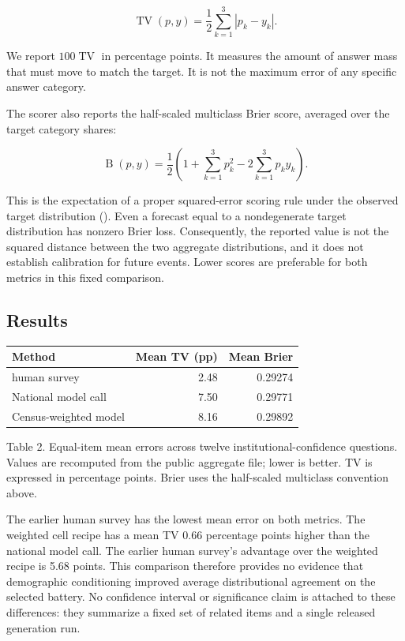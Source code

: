 \documentclass[
  11pt,
]{article}
\begin{document}
\[
\operatorname{TV}(p,y)=\frac{1}{2}\sum_{k=1}^{3}|p_k-y_k|.
\]

We report \(100\operatorname{TV}\) in percentage points. It measures the
amount of answer mass that must move to match the target. It is not the
maximum error of any specific answer category.

The scorer also reports the half-scaled multiclass Brier score, averaged
over the target category shares:

\[
\operatorname{B}(p,y)=\frac{1}{2}\left(1+\sum_{k=1}^{3}p_k^2-2\sum_{k=1}^{3}p_k y_k\right).
\]

This is the expectation of a proper squared-error scoring rule under the
observed target distribution ().
Even a forecast equal to a nondegenerate target distribution has nonzero
Brier loss. Consequently, the reported value is not the squared distance
between the two aggregate distributions, and it does not establish
calibration for future events. Lower scores are preferable for both
metrics in this fixed comparison.

\subsection{Results}\label{results}

\begin{longtable}[]{@{}lrr@{}}
\toprule\noalign{}
Method & Mean TV (pp) & Mean Brier \\
\midrule\noalign{}
\endhead
\bottomrule\noalign{}
\endlastfoot
2022 human survey & 2.48 & 0.29274 \\
National model call & 7.50 & 0.29771 \\
Census-weighted model & 8.16 & 0.29892 \\
\end{longtable}

Table 2. Equal-item mean errors across twelve institutional-confidence
questions. Values are recomputed from the public aggregate file; lower
is better. TV is expressed in percentage points. Brier uses the
half-scaled multiclass convention above.

The earlier human survey has the lowest mean error on both metrics. The
weighted cell recipe has a mean TV 0.66 percentage points higher than
the national model call. The earlier human survey's advantage over the
weighted recipe is 5.68 points. This comparison therefore provides no
evidence that demographic conditioning improved average distributional
agreement on the selected battery. No confidence interval or
significance claim is attached to these differences: they summarize a
fixed set of related items and a single released generation run.
\end{document}
